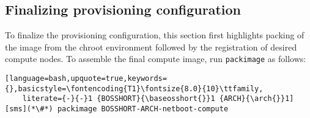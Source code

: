 \subsection{Finalizing provisioning configuration} \label{sec:assemble_bootstrap}

To finalize the \Confluent{} provisioning configuration, this section first highlights
packing of the image from the chroot environment followed by the
registration of desired compute nodes. To assemble the final compute image, run
\texttt{packimage} as follows:

\begin{lstlisting}[language=bash,upquote=true,keywords={},basicstyle=\fontencoding{T1}\fontsize{8.0}{10}\ttfamily,
    literate={-}{-}1 {BOSSHORT}{\baseosshort{}}1 {ARCH}{\arch{}}1]
[sms](*\#*) packimage BOSSHORT-ARCH-netboot-compute
\end{lstlisting}
